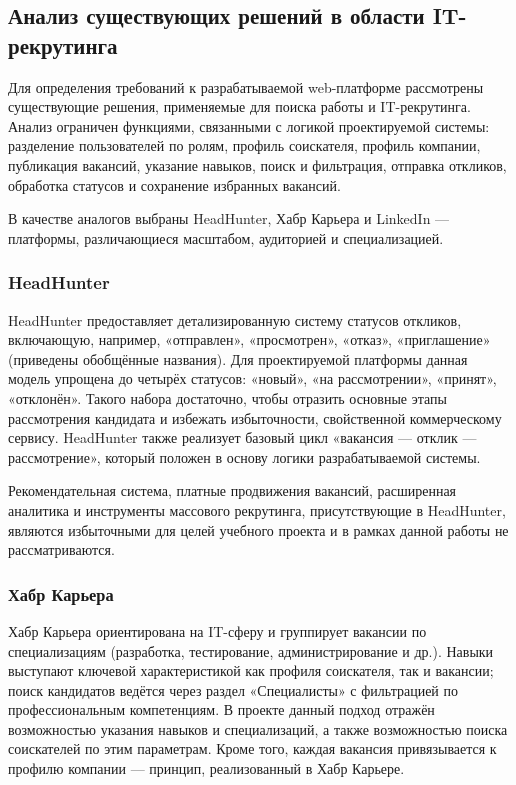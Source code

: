 \subsection{Анализ существующих решений в области IT-рекрутинга}

Для определения требований к разрабатываемой web-платформе рассмотрены существующие решения, применяемые для поиска работы и IT-рекрутинга. Анализ ограничен функциями, связанными с логикой проектируемой системы: разделение пользователей по ролям, профиль соискателя, профиль компании, публикация вакансий, указание навыков, поиск и фильтрация, отправка откликов, обработка статусов и сохранение избранных вакансий.

В качестве аналогов выбраны HeadHunter, Хабр Карьера и LinkedIn --- платформы, различающиеся масштабом, аудиторией и специализацией.

\subsubsection{HeadHunter}

HeadHunter предоставляет детализированную систему статусов откликов, включающую, например, «отправлен», «просмотрен», «отказ», «приглашение» (приведены обобщённые названия). Для проектируемой платформы данная модель упрощена до четырёх статусов: «новый», «на рассмотрении», «принят», «отклонён». Такого набора достаточно, чтобы отразить основные этапы рассмотрения кандидата и избежать избыточности, свойственной коммерческому сервису. HeadHunter также реализует базовый цикл «вакансия --- отклик --- рассмотрение», который положен в основу логики разрабатываемой системы.

Рекомендательная система, платные продвижения вакансий, расширенная аналитика и инструменты массового рекрутинга, присутствующие в HeadHunter, являются избыточными для целей учебного проекта и в рамках данной работы не рассматриваются.

\subsubsection{Хабр Карьера}

Хабр Карьера ориентирована на IT-сферу и группирует вакансии по специализациям (разработка, тестирование, администрирование и др.). Навыки выступают ключевой характеристикой как профиля соискателя, так и вакансии; поиск кандидатов ведётся через раздел «Специалисты» с фильтрацией по профессиональным компетенциям. В проекте данный подход отражён возможностью указания навыков и специализаций, а также возможностью поиска соискателей по этим параметрам. Кроме того, каждая вакансия привязывается к профилю компании --- принцип, реализованный в Хабр Карьере.

